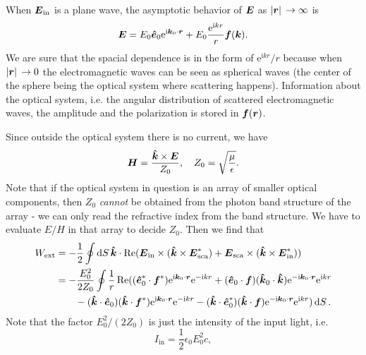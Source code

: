 \documentclass[hyperref, a4paper]{article}
\newcommand*{\ii}{\mathrm{i}}
\newcommand*{\ee}{\mathrm{e}}
\begin{document}
When $\vb*{E}_\text{in}$ is a plane wave, the asymptotic behavior of $\vb*{E}$ as $\abs*{\vb*{r}} \to \infty$ is 
\begin{equation}
    \vb*{E} = E_0 \vu*{e}_0 \ee^{\ii \vb*{k}_0 \cdot \vb*{r}} + E_0 \frac{\ee^{\ii k r}}{r} \vb*{f}(\vb*{k}).
\end{equation}
We are sure that the spacial dependence is in the form of $\ee^{\ii k r} / r$ because when $\abs*{\vb*{r}} \to 0$
the electromagnetic waves can be seen as spherical waves (the center of the sphere being the optical system where 
scattering happens). Information about the optical system, i.e. the angular distribution of scattered 
electromagnetic waves, the amplitude and the polarization is stored in $\vb*{f}(\vb*{r})$.

Since outside the optical system there is no current, we have 
\begin{equation}
    \vb*{H} = \frac{\vu*{k} \times \vb*{E}}{Z_0}, \quad Z_0 = \sqrt{\frac{\mu}{\epsilon}}.
\end{equation}
Note that if the optical system in question is an array of smaller optical components, 
then $Z_0$ \emph{cannot} be obtained from the photon band structure of the array 
- we can only read the refractive index from the band structure. 
We have to evaluate $E / H$ in that array to decide $Z_0$.
Then we find that 
\begin{equation}
    \begin{aligned}
        W_\text{ext} &= - \frac{1}{2} \oint \dd{S} \vu*{k} \cdot 
            \Re (\vb*{E}_\text{in} \times (\vu*{k} \times \vb*{E}_\text{sca}^*) + \vb*{E}_\text{sca} \times (\vu*{k} \times \vb*{E}_\text{in}^*)) \\
        &= - \frac{E_0^2}{2 Z_0} \oint \frac{1}{r} \Re (
        (\vu*{e}^*_0 \cdot \vb*{f}^* ) \ee^{\ii \vb*{k}_0 \cdot \vb*{r}} \ee^{- \ii k r} 
        + (\vu*{e}_0 \cdot \vb*{f}) (\vu*{k}_0 \cdot \vu*{k}) \ee^{- \ii \vb*{k}_0 \cdot \vb*{r}} \ee^{\ii k r} \\
        &\quad \quad  - (\vu*{k} \cdot \vu*{e}_0) (\vu*{k} \cdot \vb*{f}^*) \ee^{\ii \vb*{k}_0 \cdot \vb*{r}} \ee^{- \ii k r} 
         - (\vu*{k} \cdot \vu*{e}_0^*) (\vu*{k} \cdot \vb*{f}) \ee^{- \ii \vb*{k}_0 \cdot \vb*{r}} \ee^{\ii k r}  ) \dd{S}.
    \end{aligned}
    \label{eq:w-ext-step-1}
\end{equation}
Note that the factor $E_0^2 / (2 Z_0)$ is just the intensity of the input light, i.e. 
\begin{equation}
    I_\text{in} = \frac{1}{2} \epsilon_0 E_0^2 c,
\end{equation}
\end{document}
